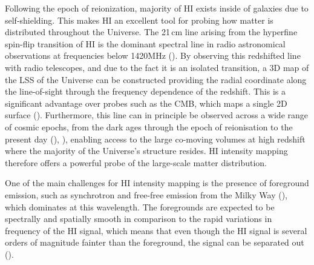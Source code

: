 Following the epoch of reionization, majority of HI exists inside of galaxies due to self-shielding. This makes HI an excellent tool for probing how matter is distributed throughout the Universe. The 21\,cm line arising from the hyperfine spin-flip transition of HI is the dominant spectral line in radio astronomical observations at frequencies below 1420MHz (\cite{peterson21CmIntensity2009}). By observing this redshifted line with radio telescopes, and due to the fact it is an isolated transition, a 3D map of the LSS of the Universe can be constructed providing the radial coordinate along the line-of-sight through the frequency dependence of the redshift. This is a significant advantage over probes such as the CMB, which maps a single 2D surface (\cite{loebPossibilityPreciseMeasurement2008a}). Furthermore, this line can in principle be observed across a wide range of cosmic epochs, from the dark ages through the epoch of reionisation to the present day (\cite{shapiro21CmBackground2006}), \cite{lewis21CmAngularpower2007a}), enabling access to the large co-moving volumes at high redshift where the majority of the Universe's structure resides. HI intensity mapping therefore offers a powerful probe of the large-scale matter distribution.


One of the main challenges for HI intensity mapping is the presence of foreground emission, such as synchrotron and free-free emission from the Milky Way (\cite{shaverCanReionizationEpoch1999a}), which dominates at this wavelength. The foregrounds are expected to be spectrally and spatially smooth in comparison to the rapid variations in frequency of the HI signal, which means that even though the HI signal is several orders of magnitude fainter than the foreground, the signal can be separated out (\cite{ohForegrounds21cmObservations2003a}). 

